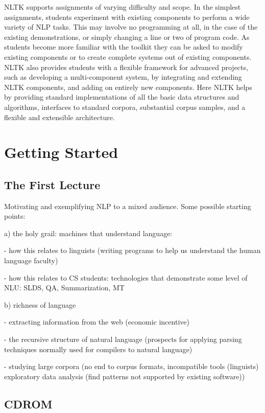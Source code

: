 \documentclass[11pt]{article}
\begin{document}
NLTK supports assignments of varying difficulty and scope. In the
simplest assignments, students experiment with existing components to
perform a wide variety of NLP tasks. This may involve no programming
at all, in the case of the existing demonstrations, or simply changing
a line or two of program code. As students become more familiar with
the toolkit they can be asked to modify existing components or to
create complete systems out of existing components. NLTK also provides
students with a flexible framework for advanced projects, such as
developing a multi-component system, by integrating and extending NLTK
components, and adding on entirely new components. Here NLTK helps by
providing standard implementations of all the basic data structures
and algorithms, interfaces to standard corpora, substantial corpus
samples, and a flexible and extensible architecture.

\section{Getting Started}
\label{sec:getting-started}

\subsection{The First Lecture}

Motivating and exemplifying NLP to a mixed audience.
Some possible starting points:

a) the holy grail: machines that understand language:

- how this relates to linguists (writing programs to help us
  understand the human language faculty)

- how this relates to CS students: technologies that demonstrate some level of NLU:
  SLDS, QA, Summarization, MT

b) richness of language

- extracting information from the web (economic incentive)

- the recursive structure of natural language (prospects for applying
  parsing techniques normally used for compilers to natural language)

- studying large corpora
  (no end to corpus formats, incompatible tools (linguists)
  exploratory data analysis (find patterns not supported by existing software))

\subsection{CDROM}
\end{document}
